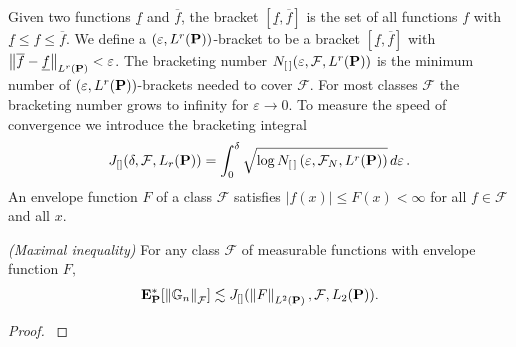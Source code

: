 Given two functions $\underline{f}$ and $\overline{f}$, the bracket
$[\underline{f},\overline{f}]$ 
is the set of all functions $f$ with 
$\underline{f}\le f \le \overline{f}$.
We define a
$(\varepsilon, L^{r}(\P))$-bracket
to be a bracket
$[\underline{f},\overline{f}]$ with
$\norm{\overline{f}-\underline{f}}_{ L^r(\P)}< \varepsilon$.
The bracketing number 
$
N_{[\,]}(\varepsilon, \mathcal{F}, L^r(\P))
$
is 
the minimum number of 
$(\varepsilon, L^{r}(\P))$-brackets needed to cover $\mathcal{F}$.
For most classes $\mathcal{F}$ the bracketing number grows to infinity for $\varepsilon\to 0$.
To measure the speed of convergence we introduce the bracketing integral
\begin{gather}
     J
    _{[]}
    (
    \delta
    ,
    \mathcal{F}
    ,
    L_r(\P)
    )
    =
  \int_0^{\delta}
      \sqrt{
        \log 
      N_{[\,]}
\left( \varepsilon, \mathcal{F}_N, L^r(\P) \right)
    }
    \,
    d\varepsilon
    \,.
\end{gather}
An envelope function $F$ of a class $\mathcal{F}$ satisfies 
$|f(x)|\le F(x)< \infty$ for all $f\in\mathcal{F}$ and all $x$.
\begin{theorem}
  \label{th:max_ineq}
  \emph{(Maximal inequality)}
  For any class $\mathcal{F}$ of measurable functions with envelope function $F,$
  \begin{gather}
    \E^*
    _\P
    [
    \norm{
      \G
      _n
      }
      _\mathcal{F}
    ]
    \lesssim
    J
    _{[]}
    (
    \norm{
      F
    }
    _{ L^2(\P)}
    ,
    \mathcal{F}
    ,
    L_2(\P)
    )
    .
  \end{gather}
\end{theorem}
\begin{proof}
  \cite[Corollary~19.35]{Vaart2000}
\end{proof}


